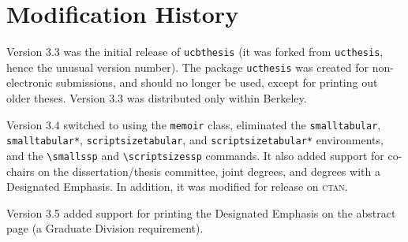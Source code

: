 \documentclass[11pt]{article}
\newcommand*{\pkg}[1]{\texttt{#1}}
\begin{document}
\section{Modification History}

Version 3.3 was the initial release of \pkg{ucbthesis} (it was forked from
\pkg{ucthesis}, hence the unusual version number).  The package \pkg{ucthesis}
was created for non-electronic submissions, and should no longer be used,
except for printing out older theses.  Version 3.3 was distributed only within
Berkeley.

Version 3.4 switched to using the \pkg{memoir} class, eliminated the
\texttt{smalltabular}, \texttt{smalltabular*}, \texttt{scriptsizetabular},
and\break
\texttt{scriptsizetabular*} environments, and the \lstinline!\smallssp!
and\break
\lstinline!\scriptsizessp! commands.  It also added support for co-chairs
on the dissertation/thesis committee, joint degrees, and degrees with a
Designated Emphasis.  In addition, it was modified for release on \textsc{ctan}.

Version 3.5 added support for printing the Designated Emphasis on the abstract
page (a Graduate Division requirement).
\end{document}
